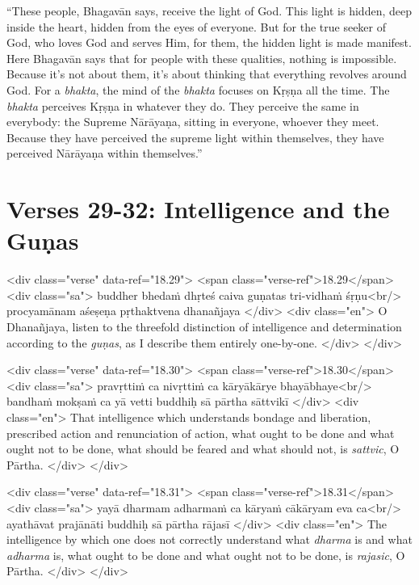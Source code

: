 \enquote{These people, Bhagavān says, receive the light of God. This light is hidden, deep inside the heart, hidden from the eyes of everyone. But for the true seeker of God, who loves God and serves Him, for them, the hidden light is made manifest. Here Bhagavān says that for people with these qualities, nothing is impossible. Because it’s not about them, it’s about thinking that everything revolves around God. For a \textit{bhakta}, the mind of the \textit{bhakta} focuses on Kṛṣṇa all the time. The \textit{bhakta} perceives Kṛṣṇa in whatever they do. They perceive the same in everybody: the Supreme Nārāyaṇa, sitting in everyone, whoever they meet. Because they have perceived the supreme light within themselves, they have perceived Nārāyaṇa within themselves.}

\newpage

\section{Verses 29-32: Intelligence and the Guṇas}\label{sec-verses-29-32-intelligence-and-the-gunas}


\begin{html}
<div class="verse" data-ref="18.29">
  <span class="verse-ref">18.29</span>
  <div class="sa">
    buddher bhedaṁ dhṛteś caiva guṇatas tri-vidhaṁ śṛṇu<br/>
    procyamānam aśeṣeṇa pṛthaktvena dhanañjaya
  </div>
  <div class="en">
    O Dhanañjaya, listen to the threefold distinction of intelligence and determination according to the \textit{guṇas}, as I describe them entirely one-by-one.
  </div>
</div>
\end{html}



\begin{html}
<div class="verse" data-ref="18.30">
  <span class="verse-ref">18.30</span>
  <div class="sa">
    pravṛttiṁ ca nivṛttiṁ ca kāryākārye bhayābhaye<br/>
    bandhaṁ mokṣaṁ ca yā vetti buddhiḥ sā pārtha sāttvikī
  </div>
  <div class="en">
    That intelligence which understands bondage and liberation, prescribed action and renunciation of action, what ought to be done and what ought not to be done, what should be feared and what should not, is \textit{sattvic}, O Pārtha.
  </div>
</div>
\end{html}



\begin{html}
<div class="verse" data-ref="18.31">
  <span class="verse-ref">18.31</span>
  <div class="sa">
    yayā dharmam adharmaṁ ca kāryaṁ cākāryam eva ca<br/>
    ayathāvat prajānāti buddhiḥ sā pārtha rājasī
  </div>
  <div class="en">
    The intelligence by which one does not correctly understand what \textit{dharma} is and what \textit{adharma} is, what ought to be done and what ought not to be done, is \textit{rajasic}, O Pārtha.
  </div>
</div>
\end{html}



